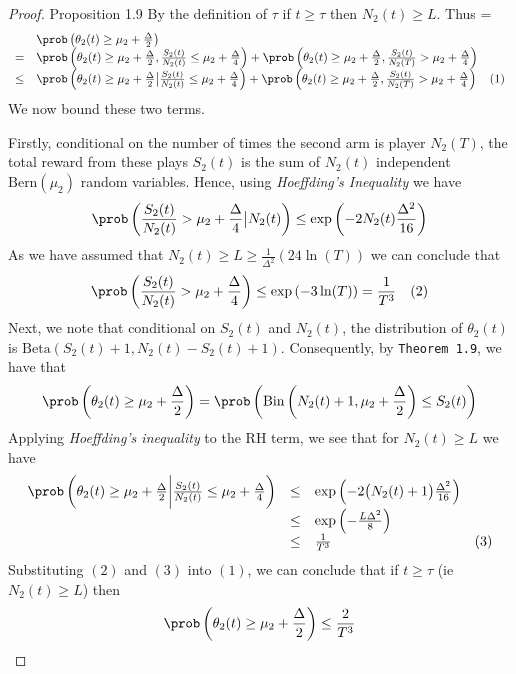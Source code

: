 \documentclass[11pt,a4paper]{article}
\begin{document}
\begin{proof}{Proposition 1.9}
  By the definition of $\tau$ if $t\geq\tau$ then $N_2(t)\geq L$. Thus
  \everymath={\displaystyle}
  \[\begin{array}{rlll}
  &\prob\left(\theta_2(t)\geq\mu_2+\frac\Delta2\right)\\
  =&\prob\left(\theta_2(t)\geq\mu_2+\frac\Delta2,\frac{S_2(t)}{N_2(t)}\leq\mu_2+\frac\Delta4\right)+\prob\left(\theta_2(t)\geq\mu_2+\frac\Delta2,\frac{S_2(t)}{N_2(T)}>\mu_2+\frac\Delta4\right)\\
  \leq&\prob\left(\theta_2(t)\geq\mu_2+\frac\Delta2\big|\frac{S_2(t)}{N_2(t)}\leq\mu_2+\frac\Delta4\right)+\prob\left(\theta_2(t)\geq\mu_2+\frac\Delta2,\frac{S_2(t)}{N_2(T)}>\mu_2+\frac\Delta4\right)&(1)\\
  \end{array}\]
  We now bound these two terms.
  \par Firstly, conditional on the number of times the second arm is player $N_2(T)$, the total reward from these plays $S_2(t)$ is the sum of $N_2(t)$ independent $\text{Bern}(\mu_2)$ random variables. Hence, using \textit{Hoeffding's Inequality} we have
  \[ \prob\left(\frac{S_2(t)}{N_2(t)}>\mu_2+\frac\Delta4\big|N_2(t)\right)\leq\exp\left(-2N_2(t)\frac{\Delta^2}{16}\right) \]
  As we have assumed that $N_2(t)\geq L\geq\frac1{\Delta^2}(24\ln(T))$ we can conclude that
  \[ \prob\left(\frac{S_2(t)}{N_2(t)}>\mu_2+\frac\Delta4\right)\leq\exp\left(-3\ln(T)\right)=\frac1{T^3}\quad(2) \]
  Next, we note that conditional on $S_2(t)$ and $N_2(t)$, the distribution of $\theta_2(t)$ is $\text{Beta}(S_2(t)+1,N_2(t)-S_2(t)+1)$. Consequently, by \texttt{Theorem 1.9}, we have that
  \[ \prob\left(\theta_2(t)\geq\mu_2+\frac\Delta2\right)=\prob\left(\text{Bin}\left(N_2(t)+1,\mu_2+\frac\Delta2\right)\leq S_2(t)\right) \]
  Applying \textit{Hoeffding's inequality} to the RH term, we see that for $N_2(t)\geq L$ we have
  \[\begin{array}{rcll}
    \prob\left(\theta_2(t)\geq\mu_2+\frac\Delta2\bigg|\frac{S_2(t)}{N_2(t)}\leq\mu_2+\frac\Delta4\right)&\leq&\exp\left(-2\big(N_2(t)+1\big)\frac{\Delta^2}{16}\right)\\
    &\leq&\exp\left(-\frac{L\Delta^2}8\right)\\
    &\leq&\frac1{T^3}&(3)
  \end{array}\]
  Substituting $(2)$ and $(3)$ into $(1)$, we can conclude that if $t\geq\tau$ (ie $N_2(t)\geq L$) then
  \[ \prob\left(\theta_2(t)\geq\mu_2+\frac\Delta2\right)\leq\frac2{T^3} \]
  \hfill\proved
\end{proof}
\end{document}
